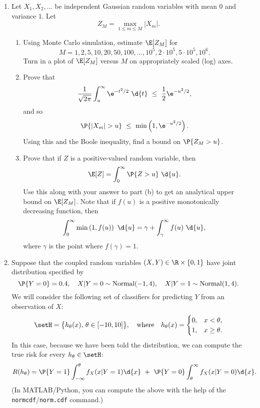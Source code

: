 \documentclass[11pt]{article}
\begin{document}
\begin{enumerate}
\begin{enumerate}
\end{enumerate}

\vspace{4mm} 
\item Let $X_1,X_2,\ldots$ be independent Gaussian random variables with mean $0$ and variance $1$.  Let
	\[
		Z_M = \max_{1\leq m\leq M} |X_m|.
	\]
	\begin{enumerate}
		\item Using Monte Carlo simulation, estimate $\E[Z_M]$ for $$M=1,2,5,10,20,50,100,\ldots,10^5,2\cdot 10^5,5\cdot 10^5, 10^6.$$  Turn in a plot of $\E[Z_M]$ versus $M$ on appropriately scaled (log) axes.
		
		\item Prove that
		\begin{equation}
			\label{eq:gausstail}
			\frac{1}{\sqrt{2\pi}}\int_u^\infty\e^{-t^2/2}~\d{t} ~\leq~ \frac{1}{2}\e^{-u^2/2},
		\end{equation}
		and so
		\[
			\P{|X_m| > u}~\leq~ \min\left(1, \e^{-u^2/2}\right).
		\]
		Using this and the Boole inequality, find a bound on $\P{Z_M > u}$.
		
		\item Prove that if $Z$ is a positive-valued random variable, then
		\[
			\E[Z] = \int_{0}^\infty \P{Z>u}~\d{u}.
		\]
		Use this along with your answer to part (b) to get an analytical upper bound on $\E[Z_M]$.  Note that if $f(u)$ is a positive monotonically decreasing function, then
		\[
			\int_{0}^\infty \min\left(1,f(u)\right)~\d{u} = \gamma + \int_{\gamma}^\infty f(u)~\d{u},
		\]
		where $\gamma$ is the point where $f(\gamma)=1$. 
	\end{enumerate}

\vspace{4mm} 
\item Suppose that the coupled random variables $(X,Y)\in\R\times\{0,1\}$ have joint distribution specified by
	\[
		\P{Y=0} = 0.4, \quad X|Y=0\sim\mathrm{Normal}(-1,4),\quad X|Y=1\sim\mathrm{Normal}(1,4).
	\]
	We will consider the following set of classifiers for predicting $Y$ from an observation of $X$:
	\[
		\setH = \big \{h_\theta(x),\,\theta\in[-10,10] \big \},
		\quad\text{where}\quad
		h_\theta(x) = 
		\begin{cases}
			0, & x < \theta, \\ 1, & x\geq\theta.
		\end{cases}
	\]
	In this case, because we have been told the distribution, we can compute the true risk for every $h_\theta\in\setH$:
	\begin{equation}
		\label{eq:riskcalc}
		R(h_\theta) = \P{Y=1}\int_{-\infty}^\theta f_{X}(x|Y=1)\d{x} ~+~ \P{Y=0}\int_\theta^\infty f_{X}(x|Y=0)\d{x}.
	\end{equation}
	(In MATLAB/Python, you can compute the above with the help of the \texttt{normcdf}/\texttt{norm.cdf} command.)
	

\end{enumerate}
\end{document}

